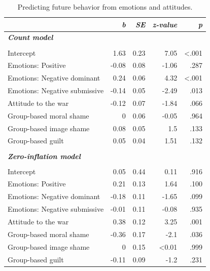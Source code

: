 \documentclass[
]{article}
\begin{document}
\begin{table}[H]
\centering
\caption{\label{tab:TableS4}Predicting future behavior from emotions and attitudes.}
\centering
\fontsize{8}{10}\selectfont
\begin{tabular}[t]{lrrrr}
\toprule
\em{ } & \em{b} & \em{SE} & \em{z-value} & \em{p}\\
\midrule
\em{\textbf{Count model}} & \em{\textbf{}} & \em{\textbf{}} & \em{\textbf{}} & \em{\textbf{}}\\
\midrule\\
Intercept & 1.63 & 0.23 & 7.05 & <.001\\
Emotions: Positive & -0.08 & 0.08 & -1.06 & .287\\
Emotions: Negative dominant & 0.24 & 0.06 & 4.32 & <.001\\
Emotions: Negative submissive & -0.14 & 0.05 & -2.49 & .013\\
\addlinespace
Attitude to the war & -0.12 & 0.07 & -1.84 & .066\\
Group-based moral shame & 0 & 0.06 & -0.05 & .964\\
Group-based image shame & 0.08 & 0.05 & 1.5 & .133\\
Group-based guilt & 0.05 & 0.04 & 1.51 & .132\\
\midrule\\
\em{\textbf{Zero-inflation model}} & \em{\textbf{}} & \em{\textbf{}} & \em{\textbf{}} & \em{\textbf{}}\\
\midrule\\
\addlinespace
Intercept & 0.05 & 0.44 & 0.11 & .916\\
Emotions: Positive & 0.21 & 0.13 & 1.64 & .100\\
Emotions: Negative dominant & -0.18 & 0.11 & -1.65 & .099\\
Emotions: Negative submissive & -0.01 & 0.11 & -0.08 & .935\\
Attitude to the war & 0.38 & 0.12 & 3.25 & .001\\
\addlinespace
Group-based moral shame & -0.36 & 0.17 & -2.1 & .036\\
Group-based image shame & 0 & 0.15 & <0.01 & .999\\
Group-based guilt & -0.11 & 0.09 & -1.2 & .231\\
\bottomrule
\end{tabular}
\end{table}
\end{document}
